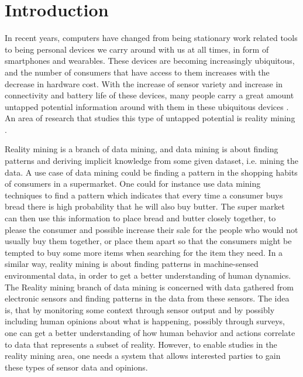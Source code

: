 \chapter{Introduction}
\label{cha:introduction}

In recent years, computers have changed from being stationary work related tools to being personal devices we carry around with us at all times, in form of smartphones and wearables. These devices are becoming increasingly ubiquitous, and the number of consumers that have access to them increases with the decrease in hardware cost. With the increase of sensor variety and increase in connectivity and battery life of these devices, many people carry a great amount untapped potential information around with them in these ubiquitous devices \parencite{statsia_fitbit}\parencite{android_os_market_share}. An area of research that studies this type of untapped potential is reality mining \parencite{eagle2006_reality_mining_definition}.

\vspace{1em}

\noindent
Reality mining is a branch of data mining, and data mining is about finding patterns and deriving implicit knowledge from some given dataset, i.e. mining the data. A use case of data mining could be finding a pattern in the shopping habits of consumers in a supermarket. One could for instance use data mining techniques to find a pattern which indicates that every time a consumer buys bread there is high probability that he will also buy butter.
The super market can then use this information to place bread and butter closely together, to please the consumer and possible increase their sale for the people who would not usually buy them together, or place them apart so that the consumers might be tempted to buy some more items when searching for the item they need. In a similar way, reality mining is about finding patterns in machine-sensed environmental data, in order to get a better understanding of human dynamics. The Reality mining branch of data mining is concerned with data gathered from electronic sensors and finding patterns in the data from these sensors. The idea is, that by monitoring some context through sensor output and by possibly including human opinions about what is happening, possibly through surveys, one can get a better understanding of how human behavior and actions correlate to data that represents a subset of reality. However, to enable studies in the reality mining area, one needs a system that allows interested parties to gain these types of sensor data and opinions. 

